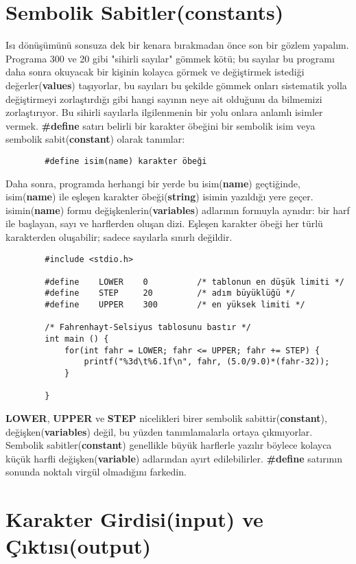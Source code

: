 \documentclass[a4paper,12pt,oneside]{book}
\begin{document}
\section{Sembolik Sabitler(constants)}

\par Isı dönüşümünü sonsuza dek bir kenara bırakmadan önce son bir gözlem yapalım. Programa 300 ve 20 gibi "sihirli sayılar" gömmek kötü; bu sayılar bu programı daha sonra okuyacak bir kişinin kolayca görmek ve değiştirmek istediği değerler(\textbf{values}) taşıyorlar, bu sayıları bu şekilde gömmek onları sistematik yolla değiştirmeyi zorlaştırdığı gibi hangi sayının neye ait olduğunu da bilmemizi zorlaştırıyor. Bu sihirli sayılarla ilgilenmenin bir yolu onlara anlamlı isimler vermek. \textbf{\#define} satırı belirli bir karakter öbeğini bir sembolik isim veya sembolik sabit(\textbf{constant}) olarak tanımlar:
\begin{lstlisting}
		#define isim(name) karakter öbeği
\end{lstlisting}
Daha sonra, programda herhangi bir yerde bu isim(\textbf{name}) geçtiğinde, isim(\textbf{name}) ile eşleşen karakter öbeği(\textbf{string}) isimin yazıldığı yere geçer. isimin(\textbf{name}) formu değişkenlerin(\textbf{variables}) adlarının formuyla aynıdır: bir harf ile başlayan, sayı ve harflerden oluşan dizi. Eşleşen karakter öbeği her türlü karakterden oluşabilir; sadece sayılarla sınırlı değildir.
\begin{lstlisting}
		#include <stdio.h>

		#define    LOWER    0          /* tablonun en düşük limiti */
		#define    STEP     20		   /* adım büyüklüğü */
		#define    UPPER    300        /* en yüksek limiti */

		/* Fahrenhayt-Selsiyus tablosunu bastır */
		int main () {
			for(int fahr = LOWER; fahr <= UPPER; fahr += STEP) {
				printf("%3d\t%6.1f\n", fahr, (5.0/9.0)*(fahr-32));
			}

		}
\end{lstlisting}

\textbf{LOWER}, \textbf{UPPER} ve \textbf{STEP} nicelikleri birer sembolik sabittir(\textbf{constant}), değişken(\textbf{variables}) değil, bu yüzden tanımlamalarla ortaya çıkmıyorlar. Sembolik sabitler(\textbf{constant}) genellikle büyük harflerle yazılır böylece kolayca küçük harfli değişken(\textbf{variable}) adlarından ayırt edilebilirler. \textbf{\#define} satırının sonunda noktalı virgül olmadığını farkedin. \pagebreak

\section{Karakter Girdisi(input) ve Çıktısı(output)}
\end{document}
